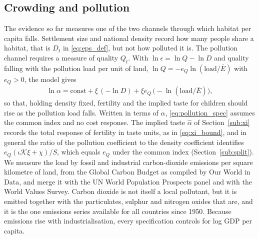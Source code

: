 \documentclass[11pt]{article}
\begin{document}
\subsection{Crowding and pollution}
\label{sub:pollution}

The evidence so far measures one of the two channels through which habitat per capita falls. Settlement
size and national density record how many people share a habitat, that is $D_t$ in
\eqref{eq:eps_def}, but not how polluted it is. The pollution channel requires a measure of quality
$Q_t$. With $\ln\epsilon=\ln Q-\ln D$ and quality falling with the pollution load per unit of land,
$\ln Q=-e_Q\ln(\text{load}/\bar E)$ with $e_Q>0$, the model gives
\begin{align}
\ln\alpha=\text{const}+\xi\,(-\ln D)+\xi e_Q\,\big(-\ln(\text{load}/\bar E)\big),
\label{eq:pollution_spec}
\end{align}
so that, holding density fixed, fertility and the implied taste for children should rise as the
pollution load falls. Written in terms of $\alpha$, \eqref{eq:pollution_spec} assumes the common index and
no cost response. The implied taste $\hat\alpha$ of Section~\ref{sub:xi} records the total response of
fertility in taste units, as in \eqref{eq:xi_bound}, and in general the ratio of the pollution
coefficient to the density coefficient identifies $e_Q(\iota\mathcal{K}\xi+\chi)/S$, which equals $e_Q$
under the common index (Section~\ref{sub:split}). We measure the load by fossil and industrial carbon-dioxide emissions per square
kilometre of land, from the Global Carbon Budget as compiled by Our World in Data, and merge it with
the UN World Population Prospects panel and with the World Values Survey. Carbon dioxide is not itself
a local pollutant, but it is emitted together with the particulates, sulphur and nitrogen oxides that
are, and it is the one emissions series available for all countries since 1950. Because emissions rise
with industrialisation, every specification controls for log GDP per capita.
\end{document}
